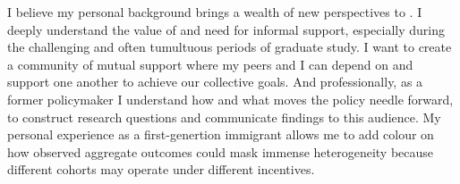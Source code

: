 %

I believe my personal background brings a wealth of new perspectives to \school. I deeply understand the value of and need for informal support, especially during the challenging and often tumultuous periods of graduate study. I want to create a community of mutual support where my peers and I can depend on and support one another to achieve our collective goals. And professionally, as a former policymaker I understand how and what moves the policy needle forward, to construct research questions and communicate findings to this audience. My personal experience as a first-genertion immigrant allows me to add colour on how observed aggregate outcomes could mask immense heterogeneity because different cohorts may operate under different incentives.
